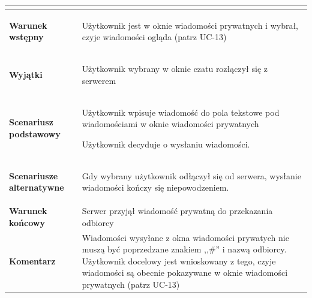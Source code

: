 {\begin{tabular}{ | l | l | }
{		}\\
		
	\hline
		\parbox[t]{4cm}{\textbf{Warunek wstępny}} & \parbox[t]{11cm}{
			\begin{enumreq}
				\item Użytkownik jest w oknie wiadomości prywatnych i
				wybrał, czyje wiadomości ogląda (patrz UC-13)
			\end{enumreq}
				
		}
		\\
		
	\hline
		\parbox[t]{4cm}{\textbf{Wyjątki}} & \parbox[t]{11cm}{
			\begin{enumreq}
				\item Użytkownik wybrany w oknie czatu rozłączył się 
				z serwerem
			\end{enumreq}
		}
		\\

	\hline
		\parbox[t]{4cm}{\textbf{Scenariusz podstawowy}} & \parbox[t]{11cm}{
			\begin{enumreq}
				\item Użytkownik wpisuje wiadomość do pola tekstowe pod
				wiadomościami w oknie wiadomości prywatnych
				\item Użytkownik decyduje o wysłaniu wiadomości.
			\end{enumreq}
		}
		\\
		
	\hline
		\parbox[t]{4cm}{\textbf{Scenariusze alternatywne}} & \parbox[t]
		{11cm}{
			\begin{enumreq}
				\item Gdy wybrany użytkownik odłączył się od serwera,
				wysłanie wiadomości kończy się niepowodzeniem.
			\end{enumreq}
		}
		\\
		
	\hline
		\parbox[t]{4cm}{\textbf{Warunek końcowy}} & \parbox[t]{11cm}{
			Serwer przyjął wiadomość prywatną do przekazania odbiorcy
		}
		\\
		
	\hline
		\parbox[t]{4cm}{\textbf{Komentarz}} & \parbox[t]{11cm}{
			Wiadomości wysyłane z okna wiadomości prywatych nie muszą być
			poprzedzane znakiem ,,\#'' i nazwą odbiorcy. Użytkownik docelowy
			jest wnioskowany z tego, czyje wiadomości są obecnie pokazywane w
			oknie wiadomości prywatnych (patrz UC-13)
		}
		\\

	\hline
\end{tabular}

}
